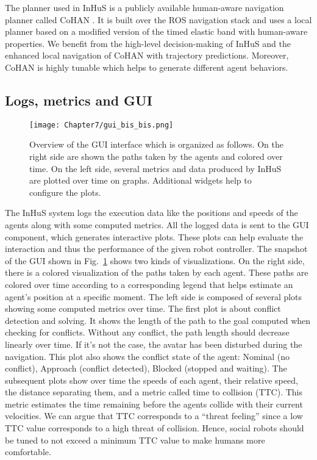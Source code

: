 The planner used in InHuS is a publicly available human-aware navigation planner called CoHAN \cite{singamaneni2021human}. It is built over the ROS navigation stack and uses a local planner based on a modified version of the timed elastic band with human-aware properties. 
We benefit from the high-level decision-making of InHuS and the enhanced local navigation of CoHAN with trajectory predictions. Moreover, CoHAN is highly tunable which helps to generate different agent behaviors. 

\subsection{Logs, metrics and GUI} \label{sec:logs_metrics}

\begin{figure}[!b]
    \centering
    \texttt{[image: Chapter7/gui\_bis\_bis.png]}
    \caption{
    Overview of the GUI interface which is organized as follows. On the right side are shown the paths taken by the agents and colored over time. On the left side, several metrics and data produced by InHuS are plotted over time on graphs. Additional widgets help to configure the plots. 
    }
    \label{fig:gui}
\end{figure}

The InHuS system logs the execution data like the positions and speeds of the agents along with some computed metrics. All the logged data is sent to the GUI component, which generates interactive plots. These plots can help evaluate the interaction and thus the performance of the given robot controller. The snapshot of the GUI shown in Fig.~\ref{fig:gui} shows two kinds of visualizations. On the right side, there is a colored visualization of the paths taken by each agent. These paths are colored over time according to a corresponding legend that helps estimate an agent's position at a specific moment. The left side is composed of several plots showing some computed metrics over time. The first plot is about conflict detection and solving. It shows the length of the path to the goal computed when checking for conflicts. Without any conflict, the path length should decrease linearly over time. If it's not the case, the avatar has been disturbed during the navigation. This plot also shows the conflict state of the agent: Nominal (no conflict), Approach (conflict detected), Blocked (stopped and waiting). The subsequent plots show over time the speeds of each agent, their relative speed, the distance separating them, 
and a metric called time to collision (TTC). This metric estimates the time remaining before the agents collide with their current velocities. We can argue that TTC corresponds to a ``threat feeling'' since a low TTC value corresponds to a high threat of collision. Hence, social robots should be tuned to not exceed a minimum TTC value to make humans more comfortable.

